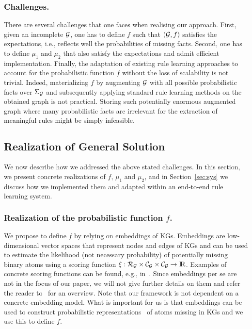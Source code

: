 \subsubsection{Challenges.} 
There are several challenges that one faces when realising our approach.
First, given an incomplete $\mathcal{G}$, one has to define $f$
such that $(\mathcal{G},f)$ satisfies the expectations, i.e., reflects well the probabilities of missing facts.
Second, one has to define $\mu_1$ and $\mu_2$ that also satisfy the expectations and admit efficient implementation.
%
Finally, the adaptation of existing rule learning approaches to account for the probabilistic function $f$ without the loss of scalability is not trivial. 
Indeed, materializing $f$ by augmenting $\mathcal{G}$ with all possible probabilistic facts over $\Sigma_{\mathcal{G}}$ and subsequently applying standard rule learning methods on the obtained graph is not practical. 
Storing such potentially enormous augmented graph 
where many probabilistic facts are irrelevant for the extraction of meaningful rules might be simply infeasible.


\subsection{Realization of General Solution}
\label{section: realisation}
We now 
describe how we addressed the above stated challenges.
In this section, 
we present concrete realizations of $f$, $\mu_1$ and $\mu_2$, and in Section~\ref{sec:sys} we discuss how we implemented them and adapted within an 
end-to-end rule learning system.


\subsubsection{Realization of the probabilistic function $f$.}
We propose to define $f$ by relying on embeddings of KGs.
Embeddings are low-dimensional vector spaces that represent nodes and edges of KGs and can be used to estimate the likelihood
(not necessary probability) of potentially missing binary atoms
using a scoring function $\mathit{\xi: \mathcal{R}_{\mathcal{G}} \times \mathcal{C}_{\mathcal{G}} \times \mathcal{C}_{\mathcal{G}}  \rightarrow {\rm I\!R}}$.
Examples of concrete scoring functions can be found, e.g., in~\cite{DBLP:journals/tkde/WangMWG17}.
Since embeddings per se 
are not in the focus of our paper,
we will not give further details on them and refer the reader to~\cite{DBLP:journals/tkde/WangMWG17} for an overview.
Note that our framework is not dependent on a concrete embedding model. 
What is important for us is that embeddings can be 
used to construct probabilistic representations~\cite{DBLP:conf/aaai/NickelRP16} of atoms missing in KGs and we use this to define $f$.

